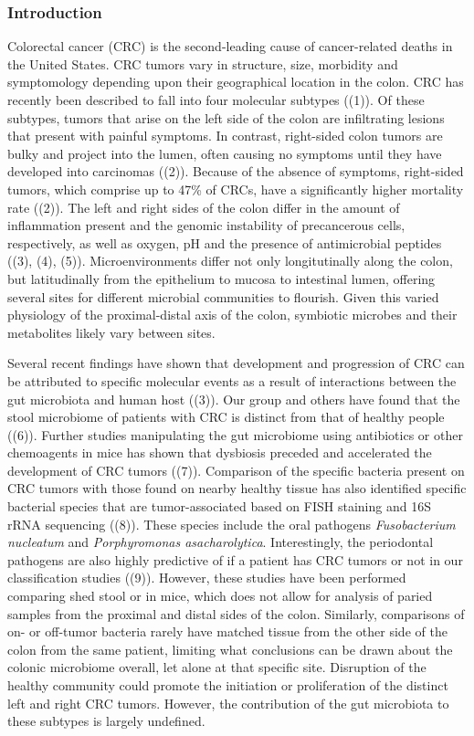 \documentclass[11pt,]{article}
\begin{document}
\subsubsection{Introduction}\label{introduction}

Colorectal cancer (CRC) is the second-leading cause of cancer-related
deaths in the United States. CRC tumors vary in structure, size,
morbidity and symptomology depending upon their geographical location in
the colon. CRC has recently been described to fall into four molecular
subtypes ((1)). Of these subtypes, tumors that arise on the left side of
the colon are infiltrating lesions that present with painful symptoms.
In contrast, right-sided colon tumors are bulky and project into the
lumen, often causing no symptoms until they have developed into
carcinomas ((2)). Because of the absence of symptoms, right-sided
tumors, which comprise up to 47\% of CRCs, have a significantly higher
mortality rate ((2)). The left and right sides of the colon differ in
the amount of inflammation present and the genomic instability of
precancerous cells, respectively, as well as oxygen, pH and the presence
of antimicrobial peptides ((3), (4), (5)). Microenvironments differ not
only longitutinally along the colon, but latitudinally from the
epithelium to mucosa to intestinal lumen, offering several sites for
different microbial communities to flourish. Given this varied
physiology of the proximal-distal axis of the colon, symbiotic microbes
and their metabolites likely vary between sites.

Several recent findings have shown that development and progression of
CRC can be attributed to specific molecular events as a result of
interactions between the gut microbiota and human host ((3)). Our group
and others have found that the stool microbiome of patients with CRC is
distinct from that of healthy people ((6)). Further studies manipulating
the gut microbiome using antibiotics or other chemoagents in mice has
shown that dysbiosis preceded and accelerated the development of CRC
tumors ((7)). Comparison of the specific bacteria present on CRC tumors
with those found on nearby healthy tissue has also identified specific
bacterial species that are tumor-associated based on FISH staining and
16S rRNA sequencing ((8)). These species include the oral pathogens
\emph{Fusobacterium nucleatum} and \emph{Porphyromonas asacharolytica}.
Interestingly, the periodontal pathogens are also highly predictive of
if a patient has CRC tumors or not in our classification studies ((9)).
However, these studies have been performed comparing shed stool or in
mice, which does not allow for analysis of paried samples from the
proximal and distal sides of the colon. Similarly, comparisons of on- or
off-tumor bacteria rarely have matched tissue from the other side of the
colon from the same patient, limiting what conclusions can be drawn
about the colonic microbiome overall, let alone at that specific site.
Disruption of the healthy community could promote the initiation or
proliferation of the distinct left and right CRC tumors. However, the
contribution of the gut microbiota to these subtypes is largely
undefined.
\end{document}
